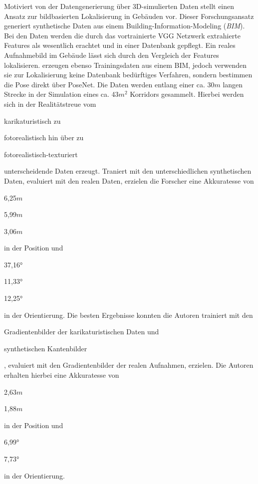 Motiviert von der Datengenerierung über 3D-simulierten Daten stellt \citet{haImagebasedIndoorLocalization2018} einen Ansatz zur bildbasierten Lokalisierung in Gebäuden vor. Dieser Forschungsansatz generiert synthetische Daten aus einem Building-Information-Modeling (\textit{BIM}). Bei den Daten werden die durch das vortrainierte VGG Netzwerk \cite{simonyanVeryDeepConvolutional2014} extrahierte Features als wesentlich erachtet und in einer Datenbank gepflegt. Ein reales Aufnahmebild im Gebäude lässt sich durch den Vergleich der Features lokalisieren. \citet{acharyaBIMPoseNetIndoorCamera2019, acharyaMODELLINGUNCERTAINTYSINGLE2019} erzeugen ebenso Trainingsdaten aus einem BIM, jedoch verwenden sie zur Lokalisierung keine Datenbank bedürftiges Verfahren, sondern bestimmen die Pose direkt über PoseNet. Die Daten werden entlang einer ca. 30$m$ langen Strecke in der Simulation eines ca. 43$m^2$ Korridors gesammelt. Hierbei werden sich in der Realitätstreue vom \begin{enumerate*}[label=\alph*)]
	\item karikaturistisch zu
	\item fotorealistisch hin über zu
	\item fotorealistisch-texturiert
\end{enumerate*} unterscheidende Daten erzeugt.
Traniert mit den unterschiedlichen synthetischen Daten, evaluiert mit den realen Daten, erzielen die Forscher eine Akkuratesse von
\begin{enumerate*}[label=\alph*)]
	\item 6,25$m$
	\item 5,99$m$
	\item 3,06$m$
\end{enumerate*}
 in der Position und  
 \begin{enumerate*}[label=\alph*)]
 	\item 37,16°
 	\item 11,33°
 	\item 12,25°
 \end{enumerate*}
 in der Orientierung.
Die besten Ergebnisse konnten die Autoren trainiert mit den 
\begin{enumerate*}[label=\alph*)]
	\addtocounter{enumi}{3}
	\item Gradientenbilder der karikaturistischen Daten und
	\item synthetischen Kantenbilder
\end{enumerate*}, evaluiert mit den Gradientenbilder der realen Aufnahmen, erzielen. Die Autoren erhalten hierbei eine Akkuratesse von 
\begin{enumerate*}[label=\alph*)]
	\addtocounter{enumi}{3}
	\item 2,63$m$
	\item 1,88$m$
\end{enumerate*}
in der Position und  
 \begin{enumerate*}[label=\alph*)]
 	\addtocounter{enumi}{3}
	\item 6,99°
	\item 7,73°
\end{enumerate*}
in der Orientierung.

